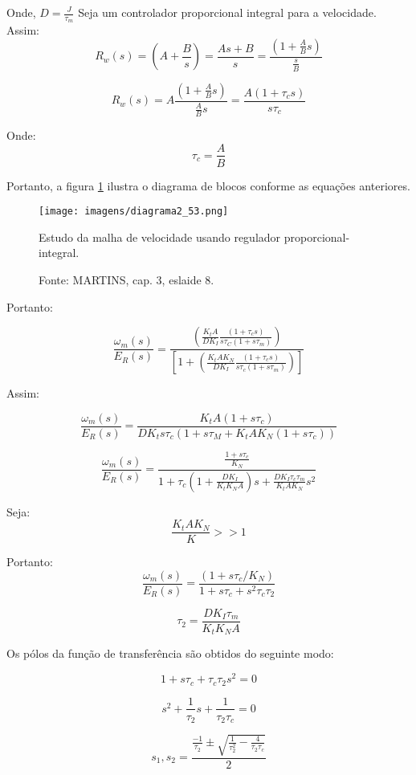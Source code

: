 Onde, $D = \frac{J}{\tau_{m}}$
Seja um controlador proporcional integral para a velocidade. Assim:
\[R_{w}(s) = 	\left ( A + \dfrac{B}{s} \right ) = \frac{As + B}{s} = \frac{\left(1 + \frac{A}{B}s\right)}{\frac{s}{B}}\]

\[R_{w}(s) = A \frac{\left(1 + \frac{A}{B}s\right)}{\frac{A}{B}s} = \frac{A\left(1 + \tau_{c}s\right)}{s\tau_{c}}\]

Onde:
\[\tau_{c} = \frac{A}{B}\]

Portanto, a figura \ref{fig:D2_53} ilustra o diagrama de blocos conforme as equações anteriores.

\begin{figure}[ht!]
\center
\texttt{[image: imagens/diagrama2\_53.png]}
\caption{\label{fig:D2_53} Estudo da malha de velocidade usando regulador proporcional-integral.}
\caption*{Fonte: MARTINS, cap. 3, eslaide 8.}
\end{figure}

Portanto:

\[\frac{\omega_{m}(s)}{E_{R}(s) } =  \frac{\left(\frac{K_{t}A}{DK_{I}}\frac{\left(1 + \tau_{c}s\right)}{s\tau_{C}\left(1 + s\tau_{m}\right)}\right)}{\left[1 + \left(\frac{K_{t}AK_{N}}{DK_{I}}\frac{\left(1 + \tau_{c}s\right)}{s\tau_{c}\left(1 + s\tau_{m}\right)}\right)\right]}\]

Assim:
 
\[\frac{\omega_{m}(s)}{E_{R}(s) } = \frac{K_{t}A\left(1 + s\tau_{c}\right)}{DK_{t}s\tau_{c}\left(1 + s\tau_{M} + K_{t}AK_{N}\left(1 + s\tau_{c}\right)\right)}\]

\[\frac{\omega_{m}(s)}{E_{R}(s) } = \frac{\frac{1 + s\tau_{c}}{K_{N}}}{1 + \tau_{c}\left(1 + \frac{DK_{I}}{K_{t}K_{N}A}\right)s + \frac{DK_{I}\tau_{c}\tau_{m}}{K_{t}AK_{N}}s^{2} }\]

Seja:
\[\frac{K_{t}AK_{N}}{K} >> 1\]

Portanto:
\[\frac{\omega_{m}(s)}{E_{R}(s) } = \frac{\left(1 + s\tau_{c}/K_{N}\right)}{1 + s\tau_{c} + s^{2}\tau_{c}\tau_{2}}\]

\[ \tau_{2} = \frac{DK_{I}\tau_{m}}{K_{t}K_{N}A}\]

Os pólos da função de transferência são obtidos do seguinte modo:

\[1 + s\tau_{c} + \tau_{c}\tau_{2}s^{2} = 0\]

\[ s^{2} + \frac{1}{\tau_{2}}s + \frac{1}{\tau_{2}\tau_{c}} = 0\]

\[s_{1},s_{2} = \frac{\frac{-1}{\tau_{2}} \pm \sqrt{\frac{1}{\tau_{2}^{2}} - \frac{4}{\tau_{2}\tau_{c}}}}{2}\]

